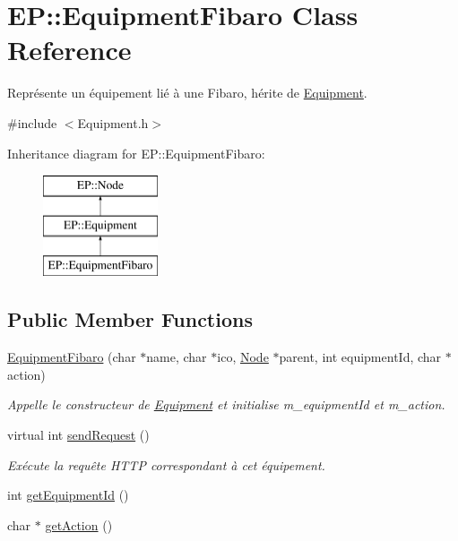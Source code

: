 \hypertarget{class_e_p_1_1_equipment_fibaro}{}\section{EP\+:\+:Equipment\+Fibaro Class Reference}
\label{class_e_p_1_1_equipment_fibaro}


Représente un équipement lié à une Fibaro, hérite de \hyperlink{class_e_p_1_1_equipment}{Equipment}.  




{\ttfamily \#include $<$Equipment.\+h$>$}

Inheritance diagram for EP\+:\+:Equipment\+Fibaro\+:\begin{figure}[H]
\begin{center}
\leavevmode
\includegraphics[height=3.000000cm]{class_e_p_1_1_equipment_fibaro}
\end{center}
\end{figure}
\subsection*{Public Member Functions}
\begin{DoxyCompactItemize}
\item 
\hyperlink{class_e_p_1_1_equipment_fibaro_a1aceacf1010faf9042e2a5a4c2f79ae8}{Equipment\+Fibaro} (char $\ast$name, char $\ast$ico, \hyperlink{class_e_p_1_1_node}{Node} $\ast$parent, int equipment\+Id, char $\ast$action)
\begin{DoxyCompactList}\small\item\em Appelle le constructeur de \hyperlink{class_e_p_1_1_equipment}{Equipment} et initialise m\+\_\+equipment\+Id et m\+\_\+action. \end{DoxyCompactList}\item 
virtual int \hyperlink{class_e_p_1_1_equipment_fibaro_aff3a8468127e7915e1757d8b9b600587}{send\+Request} ()\hypertarget{class_e_p_1_1_equipment_fibaro_aff3a8468127e7915e1757d8b9b600587}{}\label{class_e_p_1_1_equipment_fibaro_aff3a8468127e7915e1757d8b9b600587}

\begin{DoxyCompactList}\small\item\em Exécute la requête H\+T\+TP correspondant à cet équipement. \end{DoxyCompactList}\item 
int \hyperlink{class_e_p_1_1_equipment_fibaro_abdd7cbd67d1f3a06dd57fa9dc3b33a59}{get\+Equipment\+Id} ()
\item 
char $\ast$ \hyperlink{class_e_p_1_1_equipment_fibaro_ad411fa6e04286c4b0eabf258226c95f3}{get\+Action} ()
\end{DoxyCompactItemize}
